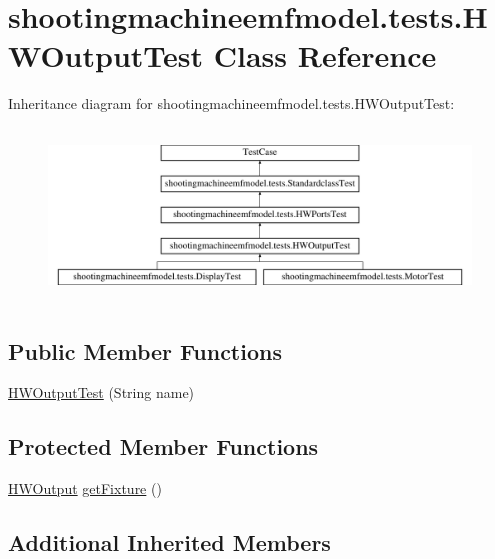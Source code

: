 \hypertarget{classshootingmachineemfmodel_1_1tests_1_1_h_w_output_test}{\section{shootingmachineemfmodel.\-tests.\-H\-W\-Output\-Test Class Reference}
\label{classshootingmachineemfmodel_1_1tests_1_1_h_w_output_test}
}
Inheritance diagram for shootingmachineemfmodel.\-tests.\-H\-W\-Output\-Test\-:\begin{figure}[H]
\begin{center}
\leavevmode
\includegraphics[height=4.620462cm]{classshootingmachineemfmodel_1_1tests_1_1_h_w_output_test}
\end{center}
\end{figure}
\subsection*{Public Member Functions}
\begin{DoxyCompactItemize}
\item 
\hyperlink{classshootingmachineemfmodel_1_1tests_1_1_h_w_output_test_ac7e87bf0f267b8cb9437765e3a530200}{H\-W\-Output\-Test} (String name)
\end{DoxyCompactItemize}
\subsection*{Protected Member Functions}
\begin{DoxyCompactItemize}
\item 
\hyperlink{interfaceshootingmachineemfmodel_1_1_h_w_output}{H\-W\-Output} \hyperlink{classshootingmachineemfmodel_1_1tests_1_1_h_w_output_test_a66108b35c008411044268dda9d5732ca}{get\-Fixture} ()
\end{DoxyCompactItemize}
\subsection*{Additional Inherited Members}


